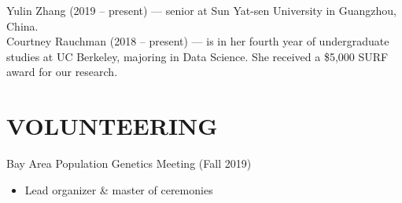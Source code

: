 \documentclass[margin, 10pt]{res} %
\begin{document}
\begin{resume}
Yulin Zhang (2019 -- present) --- senior at Sun Yat-sen University in Guangzhou, China. \vspace{0.1cm}\\
Courtney Rauchman (2018 -- present) --- is in her fourth year of undergraduate studies at UC Berkeley, majoring in Data Science. She received a \$5,000 SURF award for our research.
 




\section{VOLUNTEERING}

Bay Area Population Genetics Meeting (Fall 2019)\\
\begin{itemize}
\item[] Lead organizer \& master of ceremonies
\end{itemize} 


\end{resume}
\end{document}
